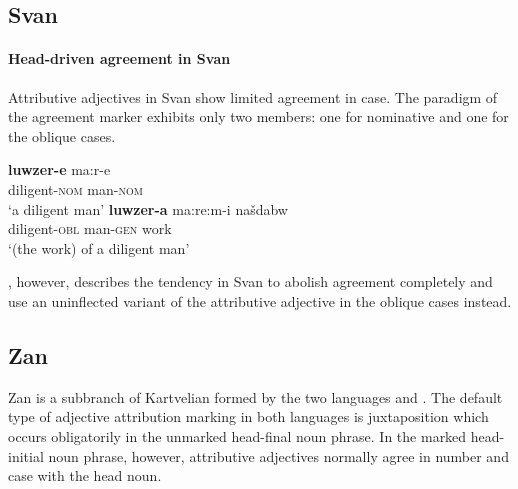 \subsection{Svan}
\paragraph*{Head\hyp{}driven agreement in Svan}
Attributive adjectives in Svan show limited agreement in case. The paradigm of the agreement marker exhibits only two members: one for nominative and one for the oblique cases.
\begin{exe}
\begin{xlist}
\ex	
\gll 	\textbf{luwzer-e}	ma:r-e\\
	diligent-\textsc{nom} man-\textsc{nom}\\
\glt	‘a diligent man’
\ex	
\gll	\textbf{luwzer-a}	ma:re:m-i 		našdabw\\
	diligent-\textsc{obl} man-\textsc{gen} work\\
\glt	‘(the work) of a diligent man’
\end{xlist}
\end{exe}
\citet[499]{schmidt1991}, however, describes the tendency in Svan to abolish agreement completely and use an uninflected variant of the attributive adjective in the oblique cases instead.

\subsection{Zan}
Zan is a subbranch of Kartvelian formed by the two languages  and . The default type of adjective attribution marking in both languages is juxtaposition which occurs obligatorily in the unmarked head-final noun phrase. In the marked head-initial noun phrase, however, attributive adjectives normally agree in number and case with the head noun.

